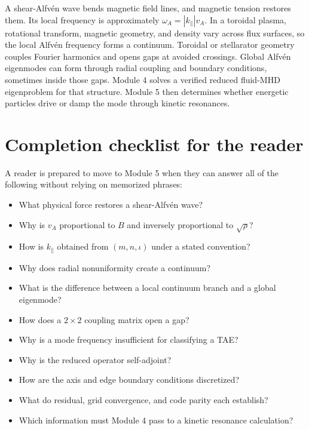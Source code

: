 \begin{overviewbox}
A shear-Alfv\'en wave bends magnetic field lines, and magnetic tension restores them. Its local frequency is approximately $\omega_A=|k_\parallel|v_A$. In a toroidal plasma, rotational transform, magnetic geometry, and density vary across flux surfaces, so the local Alfv\'en frequency forms a continuum. Toroidal or stellarator geometry couples Fourier harmonics and opens gaps at avoided crossings. Global Alfv\'en eigenmodes can form through radial coupling and boundary conditions, sometimes inside those gaps. Module 4 solves a verified reduced fluid-MHD eigenproblem for that structure. Module 5 then determines whether energetic particles drive or damp the mode through kinetic resonances.
\end{overviewbox}

\section{Completion checklist for the reader}
A reader is prepared to move to Module 5 when they can answer all of the following without relying on memorized phrases:
\begin{itemize}[leftmargin=1.6em]
\item What physical force restores a shear-Alfv\'en wave?
\item Why is $v_A$ proportional to $B$ and inversely proportional to $\sqrt\rho$?
\item How is $k_\parallel$ obtained from $(m,n,\iota)$ under a stated convention?
\item Why does radial nonuniformity create a continuum?
\item What is the difference between a local continuum branch and a global eigenmode?
\item How does a $2\times2$ coupling matrix open a gap?
\item Why is a mode frequency insufficient for classifying a TAE?
\item Why is the reduced operator self-adjoint?
\item How are the axis and edge boundary conditions discretized?
\item What do residual, grid convergence, and code parity each establish?
\item Which information must Module 4 pass to a kinetic resonance calculation?
\end{itemize}
